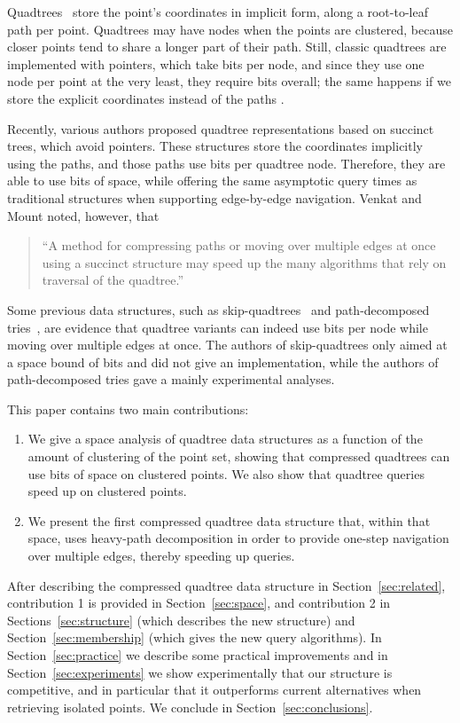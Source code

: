 \documentclass{elsarticle}
\begin{document}
Quadtrees~\cite{Mor66,Sam06} store the point's coordinates in implicit form, along a root-to-leaf path per point. Quadtrees may have  nodes when the points are clustered, because closer points tend to share a longer part of their path. Still, classic quadtrees are implemented with pointers, which take  bits per node, and since they use one node per point at the very least, they require  bits overall; the same happens if we store the explicit coordinates instead of the paths \cite{Gar82}.  

Recently, various authors \cite{BLN14,VM14,BCBNP20} proposed quadtree representations based on succinct trees, which avoid pointers. These structures store the coordinates implicitly using the paths, and those paths use  bits per quadtree node. Therefore, they are able to use  bits of space, while offering the same asymptotic query times as traditional structures when supporting edge-by-edge navigation. Venkat and Mount \cite{VM14} noted, however, that
\begin{quotation}
``A method for compressing paths or moving over multiple edges at once using a succinct structure may speed up the many algorithms that rely on traversal of the quadtree.''
\end{quotation}
Some previous data structures, such as skip-quadtrees~\cite{EGS08} and path-decomposed tries~\cite{GO14}, are evidence that quadtree variants can indeed use  bits per node while moving over multiple edges at once. The authors of skip-quadtrees only aimed at a space bound of  bits and did not give an implementation, while the authors of path-decomposed tries gave a mainly experimental analyses.

This paper contains two main contributions:
\begin{enumerate}
    \item We give a space analysis of quadtree data structures as a function of the amount of clustering of the point set, showing that compressed quadtrees can use  bits of space on clustered points. We also show that quadtree queries speed up on clustered points.
    \item We present the first compressed quadtree data structure that, within that space, uses heavy-path decomposition in order to provide one-step navigation over multiple edges, thereby speeding up queries.
\end{enumerate}

After describing the compressed quadtree data structure in Section~\ref{sec:related},
contribution 1 is provided in Section~\ref{sec:space}, and contribution 2 in Sections~\ref{sec:structure} (which describes the new structure) and Section~\ref{sec:membership} (which gives the new query algorithms).  In Section~\ref{sec:practice} we describe some practical improvements and in Section~\ref{sec:experiments} we show experimentally that our structure is competitive, and in particular that it outperforms current alternatives when retrieving isolated points. We conclude in
Section~\ref{sec:conclusions}.
\end{document}
